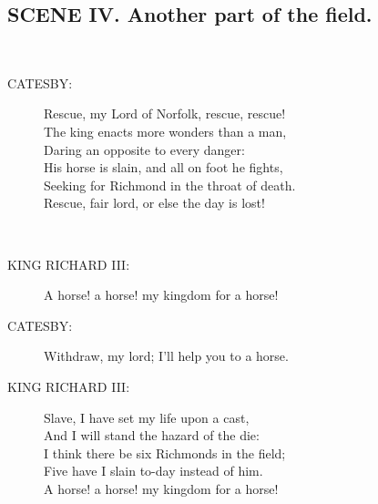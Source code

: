 \documentclass{article}
\begin{document}
\subsection*{SCENE IV.  Another part of the field.}
\\
\begin{description}
\item[CATESBY:] 
\hspace{1pt}Rescue, my Lord of Norfolk, rescue, rescue!\\
\hspace{1pt}The king enacts more wonders than a man,\\
\hspace{1pt}Daring an opposite to every danger:\\
\hspace{1pt}His horse is slain, and all on foot he fights,\\
\hspace{1pt}Seeking for Richmond in the throat of death.\\
\hspace{1pt}Rescue, fair lord, or else the day is lost!\\
\end{description}
\\
\begin{description}
\item[KING RICHARD III:] 
\hspace{1pt}A horse! a horse! my kingdom for a horse!\\
\end{description}
\begin{description}
\item[CATESBY:] 
\hspace{1pt}Withdraw, my lord; I'll help you to a horse.\\
\end{description}
\begin{description}
\item[KING RICHARD III:] 
\hspace{1pt}Slave, I have set my life upon a cast,\\
\hspace{1pt}And I will stand the hazard of the die:\\
\hspace{1pt}I think there be six Richmonds in the field;\\
\hspace{1pt}Five have I slain to-day instead of him.\\
\hspace{1pt}A horse! a horse! my kingdom for a horse!\\
\end{description}
\centering{\it [Exeunt]}\\
\end{document}
